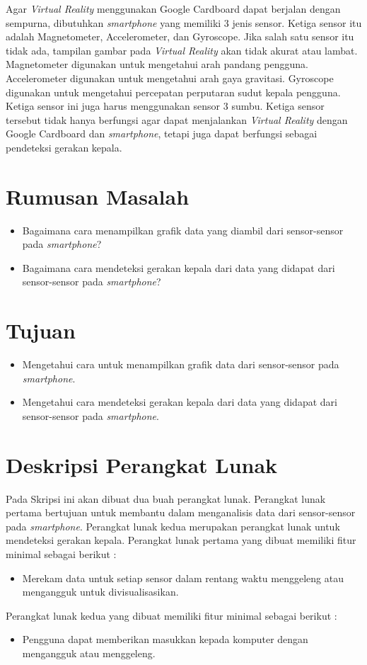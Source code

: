 \documentclass[a4paper,twoside]{article}
\begin{document}
Agar \textit{Virtual Reality} menggunakan Google Cardboard dapat berjalan dengan sempurna, dibutuhkan \textit{smartphone} yang memiliki 3 jenis sensor. Ketiga sensor itu adalah Magnetometer, Accelerometer, dan Gyroscope. Jika salah satu sensor itu tidak ada, tampilan gambar pada \textit{Virtual Reality} akan tidak akurat atau lambat. Magnetometer digunakan  untuk mengetahui arah pandang pengguna. Accelerometer digunakan untuk mengetahui arah gaya gravitasi. Gyroscope digunakan untuk mengetahui percepatan perputaran sudut kepala pengguna. Ketiga sensor ini juga harus menggunakan sensor 3 sumbu. Ketiga sensor tersebut tidak hanya berfungsi agar dapat menjalankan \textit{Virtual Reality} dengan Google Cardboard dan \textit{smartphone}, tetapi juga dapat berfungsi sebagai pendeteksi gerakan kepala.

\section{Rumusan Masalah}

\begin{itemize}
	\item Bagaimana cara menampilkan grafik data yang diambil dari sensor-sensor pada \textit{smartphone}?
	\item Bagaimana cara mendeteksi gerakan kepala dari data yang didapat dari sensor-sensor pada \textit{smartphone}?
\end{itemize}

\section{Tujuan}

\begin{itemize}
	\item Mengetahui cara untuk menampilkan grafik data dari sensor-sensor pada \textit{smartphone}.
	\item Mengetahui cara mendeteksi gerakan kepala dari data yang didapat dari sensor-sensor pada \textit{smartphone}.
\end{itemize}
\section{Deskripsi Perangkat Lunak}
Pada Skripsi ini akan dibuat dua buah perangkat lunak. Perangkat lunak pertama bertujuan untuk membantu dalam menganalisis data dari sensor-sensor pada \textit{smartphone}. Perangkat lunak kedua merupakan perangkat lunak untuk mendeteksi gerakan kepala.
Perangkat lunak pertama yang dibuat memiliki fitur minimal sebagai berikut :
\begin{itemize}
\item	Merekam data untuk setiap sensor dalam rentang waktu menggeleng atau mengangguk untuk divisualisasikan.
\end{itemize}
Perangkat lunak kedua yang dibuat memiliki fitur minimal sebagai berikut :
\begin{itemize}
\item	Pengguna dapat memberikan masukkan kepada komputer dengan mengangguk atau menggeleng.
\end{itemize}
\end{document}
